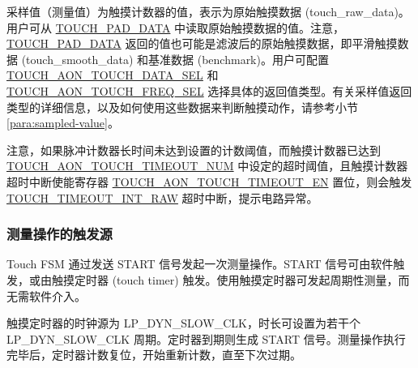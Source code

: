 \documentclass[main\_\_CN.tex]{subfiles}
\begin{document}
采样值（测量值）为触摸计数器的值，表示为原始触摸数据 (touch\_raw\_data)。用户可从 \hyperref[fielddesc:TOUCHPAD0DATA]{TOUCH\_PAD\_DATA} 中读取原始触摸数据的值。注意，\hyperref[fielddesc:TOUCHPAD0DATA]{TOUCH\_PAD\_DATA} 返回的值也可能是滤波后的原始触摸数据，即平滑触摸数据 (touch\_smooth\_data) 和基准数据 (benchmark)。用户可配置 \hyperref[fielddesc:TOUCHAONTOUCHDATASEL]{TOUCH\_AON\_TOUCH\_DATA\_SEL} 和 \hyperref[fielddesc:TOUCHAONTOUCHFREQSEL]{TOUCH\_AON\_TOUCH\_FREQ\_SEL} 选择具体的返回值类型。有关采样值返回类型的详细信息，以及如何使用这些数据来判断触摸动作，请参考小节 \ref{para:sampled-value}。

\begin{tiplisting}
注意，如果脉冲计数器长时间未达到设置的计数阈值，而触摸计数器已达到 \hyperref[fielddesc:TOUCHAONTOUCHTIMEOUTNUM]{TOUCH\_AON\_TOUCH\_TIMEOUT\_NUM} 中设定的超时阈值，且触摸计数器超时中断使能寄存器 \hyperref[fielddesc:TOUCHAONTOUCHTIMEOUTEN]{TOUCH\_AON\_TOUCH\_TIMEOUT\_EN} 置位，则会触发 \\ \hyperref[fielddesc:TOUCHTIMEOUTINTRAW]{TOUCH\_TIMEOUT\_INT\_RAW} 超时中断，提示电路异常。
\end{tiplisting}

\subsubsection{测量操作的触发源}

Touch FSM 通过发送 START 信号发起一次测量操作。START 信号可由软件触发，或由触摸定时器 (touch timer) 触发。使用触摸定时器可发起周期性测量，而无需软件介入。

触摸定时器的时钟源为 LP\_DYN\_SLOW\_CLK，时长可设置为若干个 LP\_DYN\_SLOW\_CLK 周期。定时器到期则生成 START 信号。测量操作执行完毕后，定时器计数复位，开始重新计数，直至下次过期。
\end{document}
